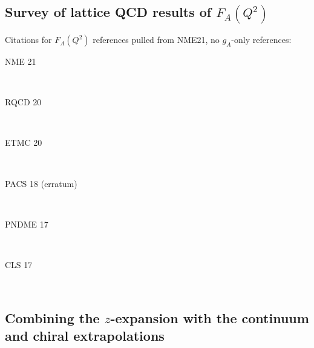 \subsection{Survey of lattice QCD results of $F_A(Q^2)$\label{sec:lqcd_results}}

Citations for $F_A(Q^2)$ references pulled from NME21, no $g_A$-only references:
\begin{description}
\item[NME 21]~\cite{Park:2021ypf}
\item[RQCD 20]~\cite{Bali:2018qus,RQCD:2019jai} %
\item[ETMC 20]~\cite{Alexandrou:2018sjm,Alexandrou:2019brg,Alexandrou:2020okk} %
\item[PACS 18 (erratum)]~\cite{Ishikawa:2018rew,Shintani:2018ozy} %
\item[PNDME 17]~\cite{Gupta:2017dwj,Gupta:2018qil,Jang:2019vkm,Jang:2019jkn} %
\item[CLS 17]~\cite{Hasan:2017wwt,Hasan:2019noy} %
\end{description}


\subsection{Combining the $z$-expansion with the continuum and chiral extrapolations\label{sec:z_continuum}}


